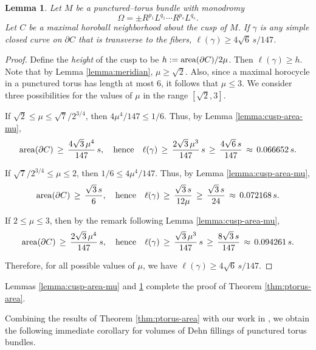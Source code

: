 \documentclass[11pt]{amsart}
\newcommand{\area}{{\rm area}}
\newcommand{\bdy}{{\partial}}
\theoremstyle{plain}
\newtheorem{lemma}[theorem]{Lemma}
\theoremstyle{definition}
\begin{document}
\begin{lemma}\label{lemma:ptorus-slope-length}
Let $M$ be a punctured--torus bundle with monodromy
$$\Omega = \pm R^{p_1}L^{q_1} \cdots R^{p_s}L^{q_s}.$$
%
Let $C$ be a maximal horoball neighborhood about the cusp of $M$.  If
$\gamma$ is any simple closed curve on $\bdy C$ that is transverse to
the fibers, $ \ell(\gamma) \geq 4\sqrt{6} \, s/147$.
\end{lemma}

\begin{proof}
Define the \emph{height} of the cusp to be $h := \area(\bdy C)/2\mu$.
Then $\ell(\gamma) \geq h$.  Note that by Lemma \ref{lemma:meridian},
$\mu \geq \sqrt{2}$.  Also, since a maximal horocycle in a punctured
torus has length at most $6$, it follows that $\mu \leq 3$.  We
consider three possibilities for the values of $\mu$ in the range
$[\sqrt{2}, 3]$.

If $\sqrt{2} \leq \mu \leq \sqrt{7}/ 2^{3/4}$, then $4 \mu^4/147 \leq
1/6$.  Thus, by Lemma \ref{lemma:cusp-area-mu},
$$ \area(\bdy C) \, \geq \, \frac{4 \sqrt{3} \, \mu^4}{147} \, s,
 \quad \mbox{hence} \quad \ell(\gamma) \, \geq \, \frac{2\sqrt{3} \,
 \mu^3}{147} \, s \, \geq \, \frac{4\sqrt{6} \,s}{147} \, \approx \,
 0.066652 \, s.$$

If $\sqrt{7}/ 2^{3/4} \leq \mu \leq 2$, then $1/6 \leq 4
\mu^4/147$. Thus, by Lemma \ref{lemma:cusp-area-mu},
$$ \area(\bdy C) \, \geq \, \frac{\sqrt{3} \, s}{6}, \quad
 \mbox{hence} \quad \ell(\gamma) \, \geq \, \frac{\sqrt{3} \, s}{12
 \mu} \, \geq \, \frac{\sqrt{3} \, s}{24} \, \approx \, 0.072168 \,
 s.$$

If $2 \leq \mu \leq 3$, then by the remark following Lemma
\ref{lemma:cusp-area-mu},
$$ \area(\bdy C) \, \geq \, \frac{ 2\sqrt{3} \, \mu^4}{147} \, s,
 \quad \mbox{hence} \quad \ell(\gamma) \, \geq \, \frac{\sqrt{3} \,
 \mu^3}{147} \, s \, \geq \, \frac{8 \sqrt{3} \,s}{147} \, \approx \,
 0.094261 \, s.$$

Therefore, for all possible values of $\mu$, we have $ \ell(\gamma)
\geq 4\sqrt{6} \, s/147$.
\end{proof}

\noindent Lemmas \ref{lemma:cusp-area-mu} and
\ref{lemma:ptorus-slope-length} complete the proof of Theorem
\ref{thm:ptorus-area}.

Combining the results of Theorem \ref{thm:ptorus-area} with our work
in \cite[Theorem 1.1]{fkp-07}, we obtain the following immediate
corollary for volumes of Dehn fillings of punctured torus bundles.
\end{document}
